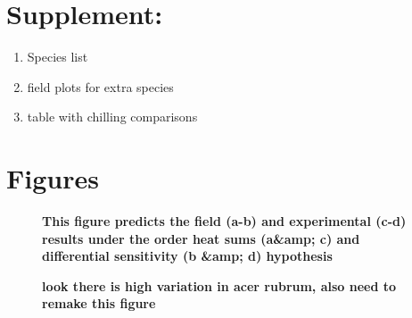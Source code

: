 \documentclass[11pt]{article}
\begin{document}
\section*{Supplement:}
\begin{enumerate}
\item Species list
\item field plots for extra species
\item table with chilling comparisons
\end{enumerate}
 

\section{Figures}

\begin{figure}[h!]
\centering
   \caption{\textbf{This figure predicts the field (a-b) and experimental (c-d) results under the order heat sums (a\&amp; c) and differential sensitivity (b \&amp; d) hypothesis}}
    \label{fig:field}
\end{figure}

\begin{figure}[h!]
    \centering
    \caption{\textbf{look there is high variation in acer rubrum, also need to remake this figure}}
    \label{fig:acerub}
\end{figure}
\end{document}
